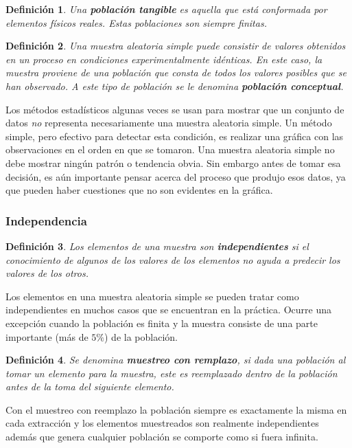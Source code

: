 \documentclass[10pt,a4paper]{book}
\newtheorem{defi}{\textbf{Definición}}
\begin{document}
\begin{defi}
	Una \textbf{población tangible} es aquella que está conformada por elementos físicos reales. Estas poblaciones son siempre finitas.
\end{defi}

\begin{defi}
	Una muestra aleatoria simple puede consistir de valores obtenidos en un proceso en condiciones experimentalmente idénticas. En este caso, la muestra proviene de una población que consta de todos los valores posibles que se han observado. A este tipo de población se le denomina \textbf{población conceptual}.
\end{defi}

Los métodos estadísticos algunas veces se usan para mostrar que un conjunto de datos \textit{no} representa necesariamente una muestra aleatoria simple. Un método simple, pero efectivo para detectar esta condición, es realizar una gráfica con las observaciones en el orden en que se tomaron. Una muestra aleatoria simple no debe mostrar ningún patrón o tendencia obvia. Sin embargo antes de tomar esa decisión, es aún importante pensar acerca del proceso que produjo esos datos, ya que pueden haber cuestiones que no son evidentes en la gráfica.\\

\subsubsection{Independencia}

\begin{defi}
	Los elementos de una muestra son \textbf{independientes} si el conocimiento de algunos de los valores de los elementos no ayuda a predecir los valores de los otros.
\end{defi}

Los elementos en una muestra aleatoria simple se pueden tratar como independientes en muchos casos que se encuentran en la práctica. Ocurre una excepción cuando la población es finita y la muestra consiste de una parte importante (más de $ 5\% $) de la población. 

\begin{defi}
	Se denomina \textbf{muestreo con remplazo}, si dada una población al tomar un elemento para la muestra, este es reemplazado dentro de la población antes de la toma del siguiente elemento.
\end{defi}

Con el muestreo con reemplazo la población siempre es exactamente la misma en cada extracción y los elementos muestreados son realmente independientes además que genera cualquier población se comporte como si fuera infinita.\\
\end{document}
